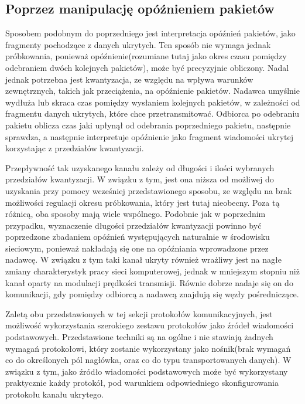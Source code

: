 \documentclass[a4paper, twoside]{report}
\begin{document}
        \subsection{Poprzez manipulację opóźnieniem pakietów}
        Sposobem podobnym do poprzedniego jest interpretacja opóźnień pakietów,
        jako fragmenty pochodzące z danych ukrytych.\cite{IPDELAYCHANNEL} Ten sposób nie wymaga jednak próbkowania,
        ponieważ opóźnienie(rozumiane tutaj jako okres czasu pomiędzy odebraniem dwóch
        kolejnych pakietów), może być precyzyjnie obliczony. Nadal jednak potrzebna
        jest kwantyzacja, ze względu na wpływa warunków zewnętrznych, takich jak przeciążenia,
        na opóźnienie pakietów. Nadawca umyślnie wydłuża lub skraca czas pomiędzy
        wysłaniem kolejnych pakietów, w zależności od fragmentu danych ukrytych,
        które chce przetransmitować. Odbiorca po odebraniu pakietu oblicza czas jaki
        upłynął od odebrania poprzedniego pakietu, następnie sprawdza, a następnie
        interpretuje opóźnienie jako fragment wiadomości ukrytej korzystając z
        przedziałów kwantyzacji.

        Przepływność tak uzyskanego kanału zależy od długości i ilości wybranych
        przedziałów kwantyzacji. W związku z tym, jest ona niższa od możliwej do
        uzyskania przy pomocy wcześniej przedstawionego sposobu, ze względu na brak
        możliwości regulacji okresu próbkowania, który jest tutaj nieobecny. Poza tą różnicą, oba sposoby mają
        wiele wspólnego. Podobnie jak w poprzednim przypadku, wyznaczenie długości
        przedziałów kwantyzacji powinno być poprzedzone zbadaniem opóźnień występujących
        naturalnie w środowisku sieciowym, ponieważ nakładają się one na opóźniania
        wprowadzone przez nadawcę. W związku z tym taki kanał ukryty również wrażliwy jest
        na nagłe zmiany charakterystyk pracy sieci komputerowej, jednak w mniejszym
        stopniu niż kanał oparty na modulacji prędkości transmisji. Równie dobrze
        nadaje się on do komunikacji, gdy pomiędzy odbiorcą a nadawcą znajdują się
        węzły pośredniczące.

        Zaletą obu przedstawionych w tej sekcji protokołów komunikacyjnych,
        jest możliwość wykorzystania szerokiego zestawu protokołów jako
        źródeł wiadomości podstawowych. Przedstawione techniki są na ogólne i
        nie stawiają żadnych wymagań protokołowi, który zostanie wykorzystany jako
        nośnik(brak wymagań co do określonych pól nagłówka, oraz co do typu transportowanych danych).
        W związku z tym, jako źródło wiadomości podstawowych może być wykorzystany
        praktycznie każdy protokół, pod warunkiem odpowiedniego skonfigurowania
        protokołu kanału ukrytego.
\end{document}
